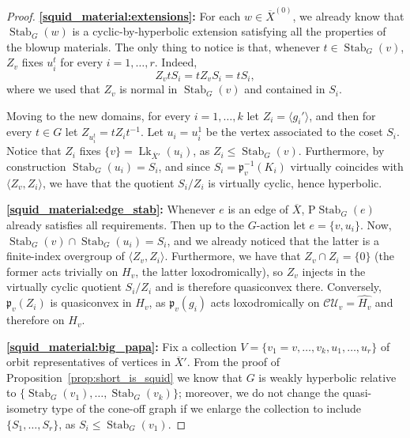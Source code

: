 \documentclass[svgnames]{amsart}
\theoremstyle{plain}
\theoremstyle{definition}
\newcommand{\C}{\mathcal C}
\newcommand{\ov}[1]{\overline{#1}}
\newcommand{\U}{\mathcal{U}}
\newcommand{\link}{\operatorname{Lk}}
\newcommand{\Stab}[2]{\operatorname{Stab}_{#1}(#2)}
\newcommand{\p}{\mathfrak{p}}
\newcommand{\h}{\widehat}
\begin{document}
\begin{proof}
\par\medskip
\textbf{\eqref{squid_material:extensions}:} 
For each $w\in\ov{X}^{(0)}$, we already know that $\Stab{G}{w}$ is a cyclic-by-hyperbolic extension satisfying all the properties of the blowup materials. The only thing to notice is that, whenever $t\in \Stab{G}{v}$, $Z_v$ fixes $u_i^t$ for every $i=1,\ldots, r$. Indeed,
$$Z_v t S_i= t Z_v S_i=t S_i,$$
where we used that $Z_v$ is normal in $\Stab{G}{v}$ and contained in $S_i$.

Moving to the new domains, for every $i=1,\ldots, k$ let $Z_i=\langle g_i'\rangle$, and then for every $t\in G$ let $Z_{u^t_i}=tZ_it^{-1}$. Let $u_i=u_i^1$ be the vertex associated to the coset $S_i$. Notice that $Z_i$ fixes $\{v\}=\link_{\ov X'}(u_i)$, as $Z_i\le\Stab{G}{v}$. Furthermore, by construction $\Stab{G}{u_i}=S_i$, and since $S_i=\p_v^{-1}(K_i)$ virtually coincides with $\langle Z_v, Z_i\rangle$, we have that the quotient $S_i/Z_{i}$ is virtually cyclic, hence hyperbolic.


\par\medskip
\textbf{\eqref{squid_material:edge_stab}:} Whenever $e$ is an edge of $\ov X$, $\text{P}\Stab{G}{e}$ already satisfies all requirements. Then up to the $G$-action let $e=\{v, u_i\}$. Now, $\Stab{G}{v}\cap\Stab{G}{u_i}=S_i$, and we already noticed that the latter is a finite-index overgroup of $\langle Z_v, Z_{i}\rangle$. Furthermore, we have that $Z_v\cap Z_{i}=\{0\}$ (the former acts trivially on $H_v$, the latter loxodromically), so $Z_v$ injects in the virtually cyclic quotient $S_i/Z_i$ and is therefore quasiconvex there. Conversely, $\p_v(Z_{i})$ is quasiconvex in $H_v$, as $\p_v(g_i)$ acts loxodromically on $\C \U_v=\h{H_v}$ and therefore on $H_v$. 




\par\medskip
\textbf{\eqref{squid_material:big_papa}:} 
Fix a collection $V=\{v_1=v,\ldots, v_k, u_1, \ldots, u_r\}$ of orbit representatives of vertices in $\ov X'$. From the proof of Proposition~\ref{prop:short_is_squid} we know that $G$ is weakly hyperbolic relative to $\{\Stab{G}{v_1},\ldots, \Stab{G}{v_k}\}$; moreover,  we do not change the quasi-isometry type of the cone-off graph if we enlarge the collection to include $\{S_1,\ldots, S_r\}$, as $S_i\le \Stab{G}{v_1}$. 


\end{proof}
\end{document}
